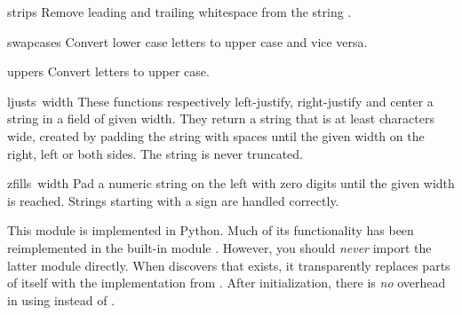 \begin{funcdesc}{strip}{s}
Remove leading and trailing whitespace from the string
.
\end{funcdesc}

\begin{funcdesc}{swapcase}{s}
Convert lower case letters to upper case and vice versa.
\end{funcdesc}

\begin{funcdesc}{upper}{s}
Convert letters to upper case.
\end{funcdesc}

\begin{funcdesc}{ljust}{s\, width}
These functions respectively left-justify, right-justify and center a
string in a field of given width.
They return a string that is at least
characters wide, created by padding the string
with spaces until the given width on the right, left or both sides.
The string is never truncated.
\end{funcdesc}

\begin{funcdesc}{zfill}{s\, width}
Pad a numeric string on the left with zero digits until the given
width is reached.  Strings starting with a sign are handled correctly.
\end{funcdesc}

This module is implemented in Python.  Much of its functionality has
been reimplemented in the built-in module .  However, you
should \emph{never} import the latter module directly.  When
 discovers that  exists, it transparently
replaces parts of itself with the implementation from .
After initialization, there is \emph{no} overhead in using
 instead of .
